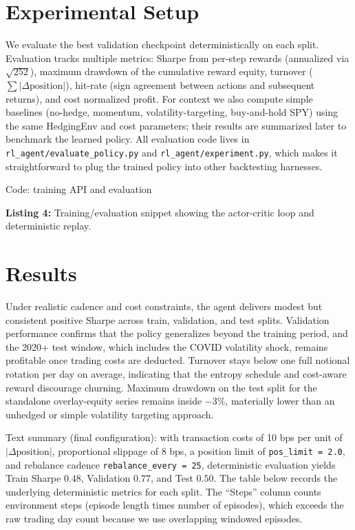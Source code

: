 \documentclass[,11pt,letterpaper,twocolumn]{article}
\begin{document}
\section{Experimental Setup}\label{experimental-setup}

We evaluate the best validation checkpoint deterministically on each
split. Evaluation tracks multiple metrics: Sharpe from per-step rewards
(annualized via $\sqrt{252}$), maximum drawdown of the cumulative
reward equity, turnover ($\sum |\Delta \text{position}|$), hit-rate
(sign agreement between actions and subsequent returns), and
cost normalized profit. For context we also compute simple baselines
(no-hedge, momentum, volatility-targeting, buy-and-hold SPY) using the
same HedgingEnv and cost parameters; their results are summarized later
to benchmark the learned policy. All evaluation code lives in
\texttt{rl\_agent/evaluate\_policy.py} and
\texttt{rl\_agent/experiment.py}, which makes it straightforward to plug
the trained policy into other backtesting harnesses.

Code: training API and evaluation

\noindent\textbf{Listing 4:} Training/evaluation snippet showing the actor-critic loop and deterministic replay.



\section{Results}\label{results}

Under realistic cadence and cost constraints, the agent delivers modest
but consistent positive Sharpe across train, validation, and test
splits. Validation performance confirms that the policy
generalizes beyond the training period, and the 2020+ test window, which
includes the COVID volatility shock, remains profitable once trading
costs are deducted. Turnover stays below one full notional rotation per
day on average, indicating that the entropy schedule and cost-aware
 reward discourage churning. Maximum drawdown on the test split for the
standalone overlay-equity series remains inside −3\%, materially lower than an unhedged or simple volatility
targeting approach.

Text summary (final configuration): with transaction costs of 10 bps per
unit of $|\Delta \text{position}|$, proportional slippage of 8 bps, a
position limit of \texttt{pos\_limit\ =\ 2.0}, and rebalance cadence
\texttt{rebalance\_every\ =\ 25}, deterministic evaluation yields Train
Sharpe $0.48$, Validation $0.77$, and Test $0.50$. The table below
records the underlying deterministic metrics for each split. The
``Steps'' column counts environment steps (episode length times number
of episodes), which exceeds the raw trading day count because we use
overlapping windowed episodes.
\end{document}
